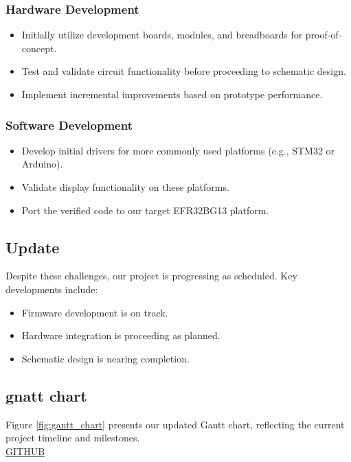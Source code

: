 \documentclass[a4paper,11pt]{article}%
\begin{document}
\subsubsection{Hardware Development}
\begin{itemize}
    \item Initially utilize development boards, modules, and breadboards for proof-of-concept.
    \item Test and validate circuit functionality before proceeding to schematic design.
    \item Implement incremental improvements based on prototype performance.
\end{itemize}

\subsubsection{Software Development}
\begin{itemize}
   
    \item Develop initial drivers for more commonly used platforms (e.g., STM32 or Arduino).
    \item Validate display functionality on these platforms.
    \item Port the verified code to our target EFR32BG13 platform.

\end{itemize}


\subsection{Update}
Despite these challenges, our project is progressing as scheduled. Key developments include:
\begin{itemize}
    \item Firmware development is on track.
    \item Hardware integration is proceeding as planned.
    \item Schematic design is nearing completion.
\end{itemize}

\subsection{gnatt chart}
Figure \ref{fig:gantt_chart} presents our updated Gantt chart, reflecting the current project timeline and milestones.\\
{\center
\href{https://github.com/users/parthishere/projects/2/views/1}
{GITHUB}}
\end{document}
